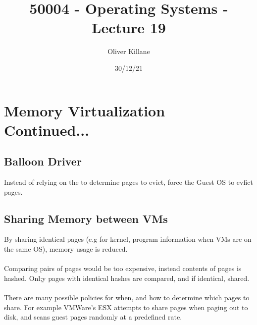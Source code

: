 \documentclass{report}
\title{50004 - Operating Systems - Lecture 19}
\author{Oliver Killane}
\date{30/12/21}
\begin{document}
\maketitle
{}

\section*{Memory Virtualization Continued...}
\subsection*{Balloon Driver}
Instead of relying on the  to determine pages to evict, force the Guest OS to evfict pages.
\subsection*{Sharing Memory between VMs}
By sharing identical pages (e.g for kernel, program information when VMs are on the same OS), memory usage is reduced.
\\
\\ Comparing pairs of pages would be too expensive, instead contents of pages is hashed. Onl;y pages with identical hashes are compared, and if identical, shared.
\\
\\ There are many possible policies for when, and how to determine which pages to share. For example VMWare's ESX attempts to share pages when paging out to disk, and scans guest pages randomly at a predefined rate.
\end{document}
